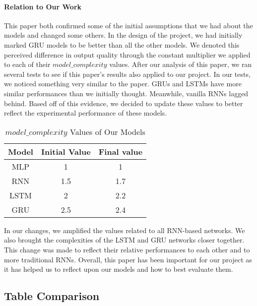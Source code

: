 \documentclass{article}
\begin{document}
    \paragraph{Relation to Our Work}

    This paper both confirmed some of the initial assumptions that we had about the models and changed some others.
    In the design of the project, we had initially marked GRU models to be better than all the other models.
    We denoted this perceived difference in output quality through the constant multiplier we applied to each of their
    $model\_complexity$ values.  After our analysis of this paper, we ran several tests to see if this paper's results
    also applied to our project.  In our tests, we noticed something very similar to the paper.  GRUs and LSTMs
    have more similar performances than we initially thought.  Meanwhile, vanilla RNNs lagged behind.  Based off of
    this evidence, we decided to update these values to better reflect the experimental performance of these models.

    \begin{table}[H]
        \begin{center}
            \caption{$model\_complexity$ Values of Our Models}
            \label{tab:modelComplexity}
            \begin{tabular}{c|c|c}
                \textbf{Model} & \textbf{Initial Value} & \textbf{Final value}\\
                \hline
                MLP & 1 & 1\\
                RNN & 1.5 & 1.7\\
                LSTM & 2 & 2.2\\
                GRU & 2.5 & 2.4
            \end{tabular}
        \end{center}
    \end{table}

    In our changes, we amplified the values related to all RNN-based networks.  We also brought the complexities
    of the LSTM and GRU networks closer together.  This change was made to reflect their relative performances to
    each other and to more traditional RNNs.  Overall, this paper has been important for our project as it has
    helped us to reflect upon our models and how to best evaluate them.

    \subsection{Table Comparison}
\end{document}
